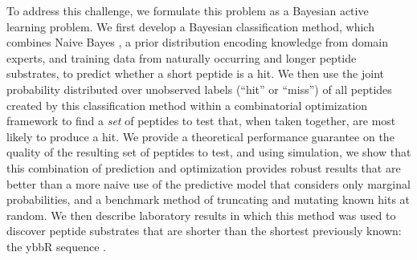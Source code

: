 \documentclass[12pt]{article}
\begin{document}




To address this challenge, we formulate this problem as a Bayesian active learning problem.  We first develop a Bayesian classification method, which combines Naive Bayes \citep{NB}, a prior distribution encoding knowledge from domain experts, and training data from naturally occurring and longer peptide substrates, to predict whether a short peptide is a hit. We then use the joint probability distributed over unobserved labels (``hit'' or ``miss'') of all peptides created by this classification method within a combinatorial optimization framework to find a {\it set} of peptides to test that, when taken together, are most likely to produce a hit.  We provide a theoretical performance guarantee on the quality of the resulting set of peptides to test, and using simulation, we show that this combination of prediction and optimization provides robust results that are better than a more naive use of the predictive model that considers only marginal probabilities, and a benchmark method of truncating and mutating known hits at random. We then describe laboratory results in which this method was used to discover peptide substrates that are shorter than the shortest previously known: the ybbR sequence \citep{ybbr}.


\end{document}
